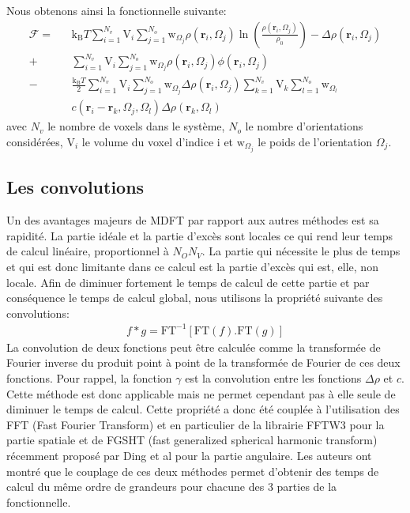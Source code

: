 Nous obtenons ainsi la fonctionnelle suivante:
\begin{eqnarray}
\mathcal{F} =& &\mathrm{k_B}T \sum\limits_{i=1}^{N_v}\mathrm{V}_i\sum\limits_{j=1}^{N_o}\mathrm{w}_{\Omega_j} \rho\left(\boldsymbol{r}_i,\Omega_j\right)\ln\left(\frac{\rho\left(\boldsymbol{r}_i,\Omega_j\right)}{\rho_0}\right)-\Delta\rho\left(\boldsymbol{r}_i,\Omega_j\right)\\
			+& &\sum\limits_{i=1}^{N_v}\mathrm{V}_i\sum\limits_{j=1}^{N_o}\mathrm{w}_{\Omega_j} \rho\left(\boldsymbol{r}_i,\Omega_j\right)\phi\left(\boldsymbol{r}_i,\Omega_j\right)\\
            -& &\frac{\mathrm{k_B}T}{2}\sum\limits_{i=1}^{N_v}\mathrm{V}_i\sum\limits_{j=1}^{N_o}\mathrm{w}_{\Omega_j} \Delta\rho\left(\boldsymbol{r}_i,\Omega_j\right) \sum\limits_{k=1}^{N_v}\mathrm{V}_k\sum\limits_{l=1}^{N_o} \mathrm{w}_{\Omega_l}\\
            & &c\left(\boldsymbol{r}_i-\boldsymbol{r}_k,\Omega_j,\Omega_l \right) \Delta\rho\left(\boldsymbol{r}_k,\Omega_l\right) \nonumber 
\end{eqnarray}
\noindent avec $N_v$ le nombre de voxels dans le système, $N_o$ le nombre d'orientations considérées, $\mathrm{V}_i$ le volume du voxel d'indice i et $\mathrm{w}_{\Omega_j}$ le poids de l'orientation $\Omega_j$.


\subsection{Les convolutions}
Un des avantages majeurs de MDFT par rapport aux autres méthodes est sa rapidité. La partie idéale et la partie d'excès sont locales ce qui rend leur temps de calcul linéaire, proportionnel à $N_O N_V$. La partie qui nécessite le plus de temps et qui est donc limitante dans ce calcul est la partie d'excès qui est, elle, non locale. Afin de diminuer fortement le temps de calcul de cette partie et par conséquence le temps de calcul global, nous utilisons la propriété suivante des convolutions:
\begin{eqnarray}
f*g = \mathrm{FT}^{-1} [ \mathrm{FT}(f) . \mathrm{FT}(g) ]
\end{eqnarray}
La convolution de deux fonctions peut être calculée comme la transformée de Fourier inverse du produit point à point de la transformée de Fourier de ces deux fonctions. Pour rappel, la fonction $\gamma$ est la convolution entre les fonctions $\Delta\rho$ et $c$. Cette méthode est donc applicable mais ne permet cependant pas à elle seule de diminuer le temps de calcul. Cette propriété a donc été couplée à l'utilisation des FFT (Fast Fourier Transform) et en particulier de la librairie FFTW3 pour la partie spatiale et de FGSHT (fast generalized spherical harmonic transform) récemment proposé par Ding et al\cite{ding_thesis} pour la partie angulaire.
Les auteurs\cite{ding_thesis} ont montré que le couplage de ces deux méthodes permet d'obtenir des temps de calcul du même ordre de grandeurs pour chacune des 3 parties de la fonctionnelle. 


